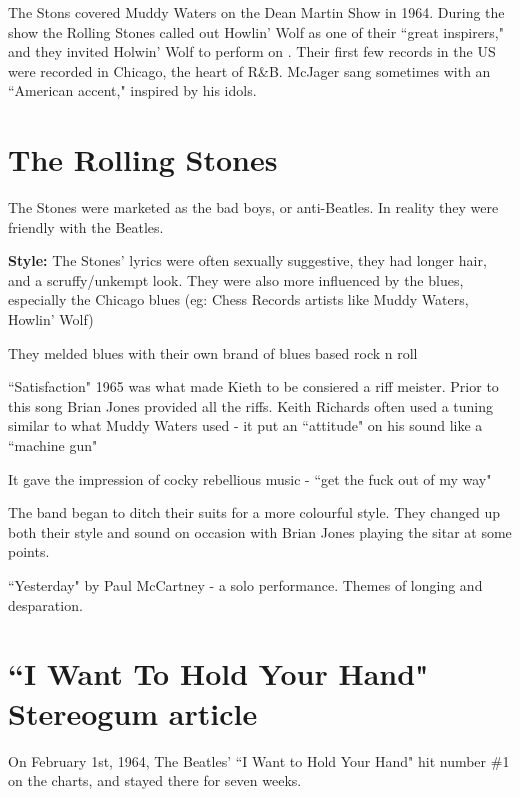 \documentclass[12pt, a4paper, twoside, openright, titlepage]{book}
\begin{document}
The Stons covered Muddy Waters on the Dean Martin Show in 1964. During the show the Rolling Stones called out Howlin' Wolf as one of their ``great inspirers," and they invited Holwin' Wolf to perform on . Their first few records in the US were recorded in Chicago, the heart of R\&B. McJager sang sometimes with an ``American accent," inspired by his idols.


\section{The Rolling Stones}

The Stones were marketed as the bad boys, or anti-Beatles. In reality they were friendly with the Beatles.

\textbf{Style:} The Stones' lyrics were often sexually suggestive, they had longer hair, and a scruffy/unkempt look. They were also more influenced by the blues, especially the Chicago blues (eg: Chess Records artists like Muddy Waters, Howlin' Wolf)


They melded blues with their own brand of blues based rock n roll

\begin{eg}{}{}
    ``Satisfaction" 1965 was what made Kieth to be consiered a riff meister. Prior to this song Brian Jones provided all the riffs. Keith Richards often used a tuning similar to what Muddy Waters used - it put an ``attitude" on his sound like a ``machine gun"

    It gave the impression of cocky rebellious music - ``get the fuck out of my way"


    The band began to ditch their suits for a more colourful style. They changed up both their style and sound on occasion with Brian Jones playing the sitar at some points.
\end{eg}

\begin{eg}{}{}
    ``Yesterday" by Paul McCartney - a solo performance. Themes of longing and desparation.
\end{eg}



\section{``I Want To Hold Your Hand" Stereogum article}


On February 1st, 1964, The Beatles' ``I Want to Hold Your Hand" hit number \#1 on the charts, and stayed there for seven weeks.
\end{document}
